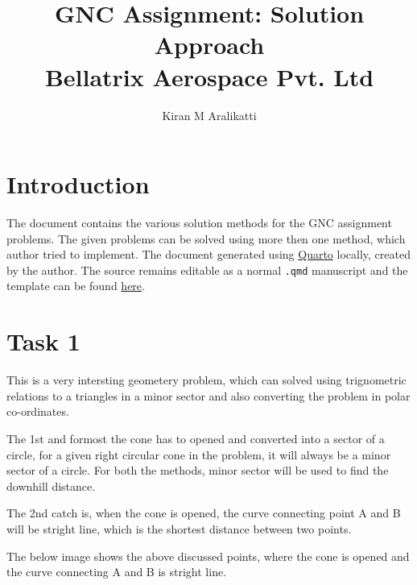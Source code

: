 \documentclass[
  number,
  preprint]{elsarticle}
\begin{document}
\begin{frontmatter}
\title{GNC Assignment: Solution Approach \\\large{Bellatrix Aerospace
Pvt. Ltd} }
\author[]{Kiran M Aralikatti%
%
}





        





\end{frontmatter}
    

\section{Introduction}\label{sec-introduction}

The document contains the various solution methods for the GNC
assignment problems. The given problems can be solved using more then
one method, which author tried to implement. The document generated
using \href{https://quarto.org/docs/journals/}{Quarto} locally, created
by the author. The source remains editable as a normal \texttt{.qmd}
manuscript and the template can be found
\href{https://github.com/kirancoder/paper_template/tree/main/sample_paper}{here}.

\section{Task 1}\label{sec-task1}

This is a very intersting geometery problem, which can solved using
trignometric relations to a triangles in a minor sector and also
converting the problem in polar co-ordinates.

The 1st and formost the cone has to opened and converted into a sector
of a circle, for a given right circular cone in the problem, it will
always be a minor sector of a circle. For both the methods, minor sector
will be used to find the downhill distance.

The 2nd catch is, when the cone is opened, the curve connecting point A
and B will be stright line, which is the shortest distance between two
points.

The below image shows the above discussed points, where the cone is
opened and the curve connecting A and B is stright line.
\end{document}

